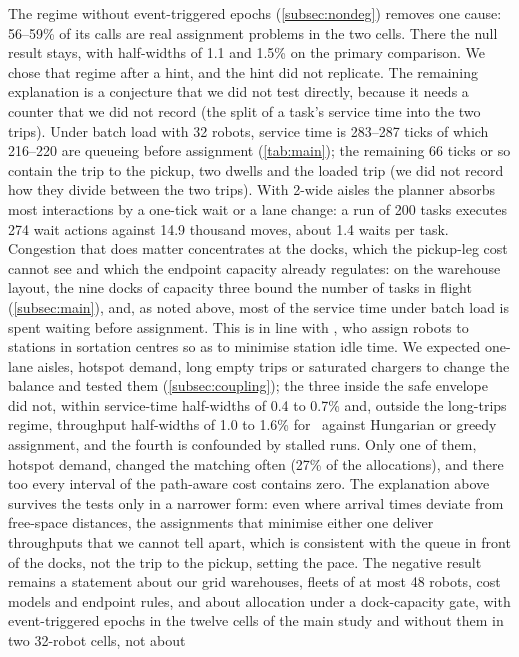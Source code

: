 The regime without event-triggered epochs (\cref{subsec:nondeg}) removes one cause: 56--59\% of its
calls are real assignment problems in the two cells. There the null result stays,
with half-widths of 1.1 and 1.5\% on the primary comparison. We chose that regime after a hint, and the hint did not
replicate. The remaining explanation is a conjecture that we did not test
directly, because it needs a counter that we did not record (the split of a task's service time
into the two trips). Under batch load with 32 robots, service time is
283--287 ticks of which 216--220 are queueing before assignment
(\cref{tab:main}); the remaining 66 ticks or so contain the trip to the
pickup, two dwells and the loaded trip (we did not record how they divide
between the two trips). With 2-wide aisles the planner absorbs
most interactions by a one-tick wait or a lane change: a run of 200 tasks
executes 274 wait actions against 14.9 thousand moves, about 1.4 waits per
task. Congestion that
does matter concentrates at the docks, which the pickup-leg cost cannot see
and which the endpoint capacity already regulates: on the warehouse layout,
the nine docks of capacity three bound the number of tasks in flight
(\cref{subsec:main}), and, as noted above, most of the service time under
batch load is spent waiting before assignment. This is in line with
\citet{kou2020idle}, who assign robots to stations in sortation centres so
as to minimise station idle time.
We expected one-lane
aisles, hotspot demand, long empty trips or saturated chargers to change the
balance and tested them (\cref{subsec:coupling}); the three inside the safe
envelope did not, within service-time half-widths of 0.4 to 0.7\% and, outside the
long-trips regime, throughput half-widths of 1.0 to 1.6\% for \sname\ against
Hungarian or greedy assignment, and the fourth is
confounded by stalled runs. Only one of them, hotspot demand, changed the
matching often (27\% of the allocations), and there too every interval of
the path-aware cost contains zero. The explanation above survives the tests only in
a narrower form: even where arrival times deviate from free-space distances,
the assignments that minimise either one deliver throughputs that we cannot
tell apart, which is consistent with the queue in front of the docks, not
the trip to the pickup, setting the pace. The negative result remains a statement about our grid warehouses,
fleets of at most 48 robots, cost models and endpoint rules, and about
allocation under a dock-capacity gate, with event-triggered epochs in the twelve
cells of the main study and without them in two 32-robot cells, not about
